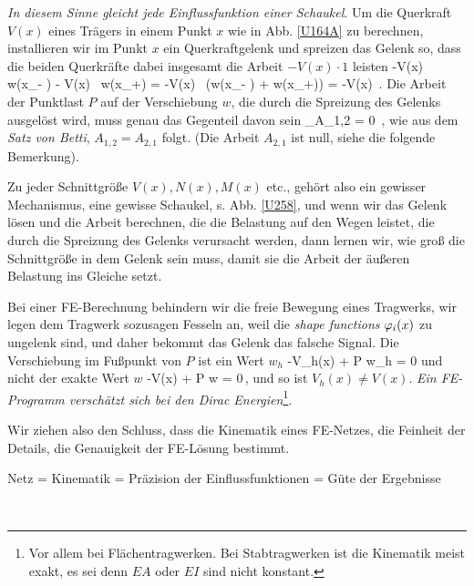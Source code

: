 {\em In diesem Sinne gleicht jede Einflussfunktion einer Schaukel\/}. Um die Querkraft $V(x)$ eines Tr\"{a}gers in einem Punkt $x$ wie in Abb.  \ref{U164A}  zu berechnen, installieren wir im Punkt $x$ ein Querkraftgelenk und spreizen das Gelenk so, dass die beiden Querkr\"{a}fte dabei insgesamt die Arbeit $- V(x) \cdot 1$ leisten
\beq
-V(x) \, w(x_{-} ) - V(x) \, w(x_{+}) = -V(x) \, (w(x_{-} )
 + w(x_{+})) = -V(x) \,.
\eeq
Die Arbeit der Punktlast $P$ auf der Verschiebung $w$, die durch die Spreizung des Gelenks ausgel\"{o}st wird, muss genau das Gegenteil davon sein
\beq
{}_{A_{1,2}} = 0 \,,
\eeq
wie aus dem {\em Satz von Betti\/}, $A_{1,2} = A_{2,1}$ folgt. (Die Arbeit $A_{2,1}$ ist null, siehe die folgende Bemerkung).


Zu jeder Schnittgr\"{o}{\ss}e $V(x), N(x), M(x)$ etc., geh\"{o}rt also ein gewisser Mechanismus, eine gewisse Schaukel, s. Abb. \ref{U258}, und wenn wir das Gelenk l\"{o}sen und die Arbeit berechnen, die die Belastung auf den Wegen leistet, die durch die Spreizung des Gelenks verursacht werden, dann lernen wir, wie gro{\ss} die Schnittgr\"{o}{\ss}e in dem Gelenk sein muss, damit sie die Arbeit der \"{a}u{\ss}eren Belastung ins Gleiche setzt.

Bei einer FE-Berechnung behindern wir die freie Bewegung eines Tragwerks, wir legen dem Tragwerk sozusagen Fesseln an, weil die {\em shape functions\/} $\varphi_i(x)$ zu \glq ungelenk\grq{} sind, und daher bekommt das Gelenk das falsche Signal. Die Verschiebung im Fu{\ss}punkt von $P$ ist ein Wert $w_h$
\beq
-V_h(x)  + P \cdot w_h = 0
\eeq
und nicht der exakte Wert $w$
\beq
-V(x)   + P \cdot w = 0\,,
\eeq
und so ist $V_h(x) \neq V(x)$. {\em Ein FE-Programm versch\"{a}tzt sich bei den Dirac Energien\/}\footnote{Vor allem bei Fl\"{a}chentragwerken. Bei Stabtragwerken ist die Kinematik meist exakt, es sei denn $EA$ oder $EI$ sind nicht konstant.}.

Wir ziehen also den Schluss, dass die Kinematik eines FE-Netzes, die Feinheit der Details, die Genauigkeit der FE-L\"{o}sung bestimmt.\\

\hspace*{-12pt}\colorbox{highlightBlue}{\parbox{0.98\textwidth}{Netz = Kinematik = Pr\"{a}zision der Einflussfunktionen = G\"{u}te der Ergebnisse}}\\

